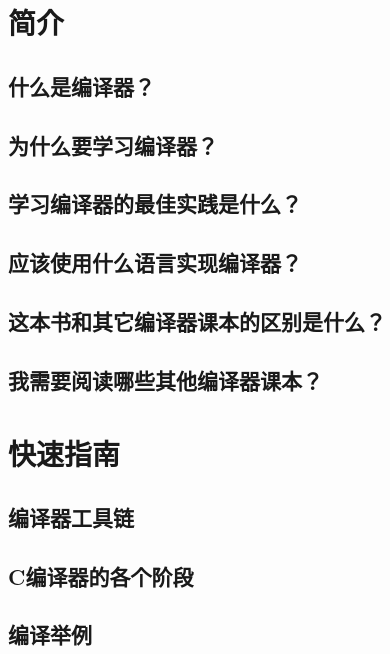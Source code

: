 \documentclass[cn,11pt,chinese]{elegantbook}
\begin{document}
\frontmatter

\tableofcontents

\mainmatter

\chapter{简介}

\section{什么是编译器？}

\section{为什么要学习编译器？}

\section{学习编译器的最佳实践是什么？}

\section{应该使用什么语言实现编译器？}

\section{这本书和其它编译器课本的区别是什么？}

\section{我需要阅读哪些其他编译器课本？}

\chapter{快速指南}

\section{编译器工具链}

\section{C编译器的各个阶段}

\section{编译举例}
\end{document}
